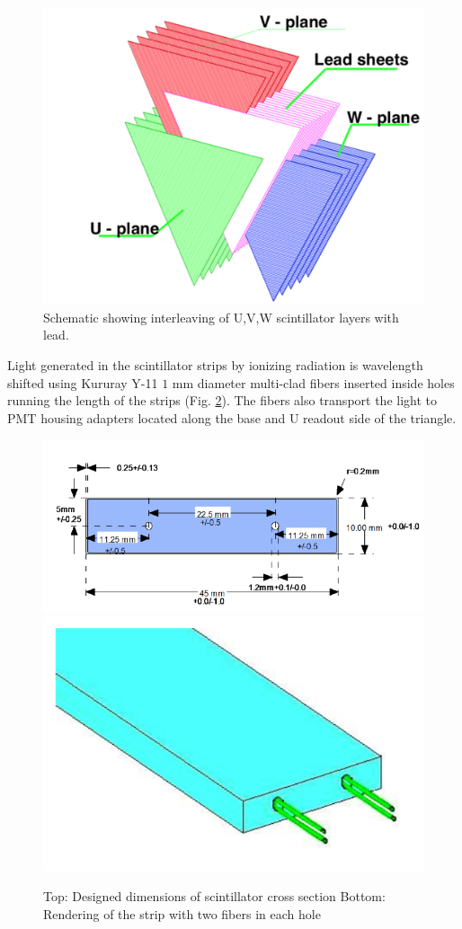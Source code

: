 \begin{figure}[hbt]
\centering
\includegraphics[width=0.95\columnwidth,keepaspectratio]{img/S3_2.png}
\caption[PCAL UVW Layers]{Schematic showing interleaving of U,V,W scintillator layers with lead. }
\label{fig:S3_2}
\end{figure}

Light generated in the scintillator strips by ionizing radiation is wavelength shifted using Kururay Y-11 $1$ mm diameter multi-clad fibers inserted inside holes running the length of the strips (Fig. \ref{fig:S3_4}). The fibers also transport the light to PMT housing adapters located along the base and U readout side of the triangle.

\begin{figure}[hbt]
\centering
\includegraphics[width=1.05\columnwidth,keepaspectratio]{img/S3_4a.png}
\includegraphics[width=0.75\columnwidth,keepaspectratio]{img/S3_4b.png}
\caption[PCAL UVW Layers]{Top: Designed dimensions of scintillator cross section Bottom: Rendering of the strip with two fibers in each hole}
\label{fig:S3_4}
\end{figure}

